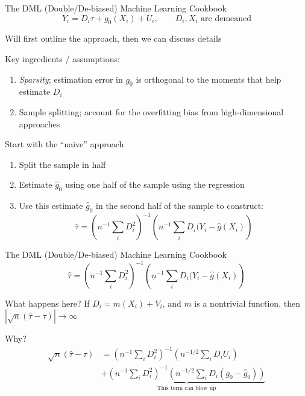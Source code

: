 \documentclass[notes,11pt, aspectratio=169]{beamer}
\newenvironment{wideitemize}{\itemize\addtolength{\itemsep}{10pt}}{\enditemize}
\begin{document}
\begin{frame}{The DML (Double/De-biased) Machine Learning Cookbook}
  $$Y_{i} = D_{i}\tau + g_{0}(X_{i}) + U_{i}, \qquad D_{i}, X_{i} \text{ are demeaned}$$  
  \begin{wideitemize}
  \item Will first outline the approach, then we can discuss details
  \item Key ingredients / assumptions:
    \begin{enumerate}
    \item \emph{Sparsity}; estimation error in $g_{0}$ is orthogonal
      to the moments that help estimate $D_{i}$
    \item Sample splitting; account for the overfitting bias from
      high-dimensional approaches
    \end{enumerate}
  \item Start with the ``naive'' approach
    \begin{enumerate}
    \item Split the sample in half
    \item Estimate $\hat{g}_{0}$ using one half of the sample using the regression
    \item Use this estimate $\hat{g}_{0}$ in the second half of the sample to construct:
      $$\hat{\tau} = \left(n^{-1}\sum_{i}D^{2}_{i}\right)^{-1}\left(n^{-1}\sum_{i}D_{i}(Y_{i} - \hat{g}(X_{i})\right)$$      
    \end{enumerate}
  \end{wideitemize}
\end{frame}

\begin{frame}{The DML (Double/De-biased) Machine Learning Cookbook}
  $$\hat{\tau} = \left(n^{-1}\sum_{i}D^{2}_{i}\right)^{-1}\left(n^{-1}\sum_{i}D_{i}(Y_{i} - \hat{g}(X_{i})\right)$$
  \begin{wideitemize}
  \item What happens here? If $D_{i} = m(X_{i}) + V_{i}$, and $m$ is a
    nontrivial function, then $|\sqrt{n}(\hat{\tau} - \tau)| \rightarrow \infty$
  \item Why?
    \begin{align*}
      \sqrt{n}(\hat{\tau} - \tau) &= \left(n^{-1}\sum_{i}D^{2}_{i}\right)^{-1}\left(n^{-1/2}\sum_{i}D_{i}U_{i}\right) \\
      &+ \underbrace{\left(n^{-1}\sum_{i}D^{2}_{i}\right)^{-1}\left(n^{-1/2}\sum_{i}D_{i}(g_{0} - \hat{g}_{0})\right)}_{\text{This term can blow up}}
      \end{align*}
  \end{wideitemize}
\end{frame}
\end{document}
